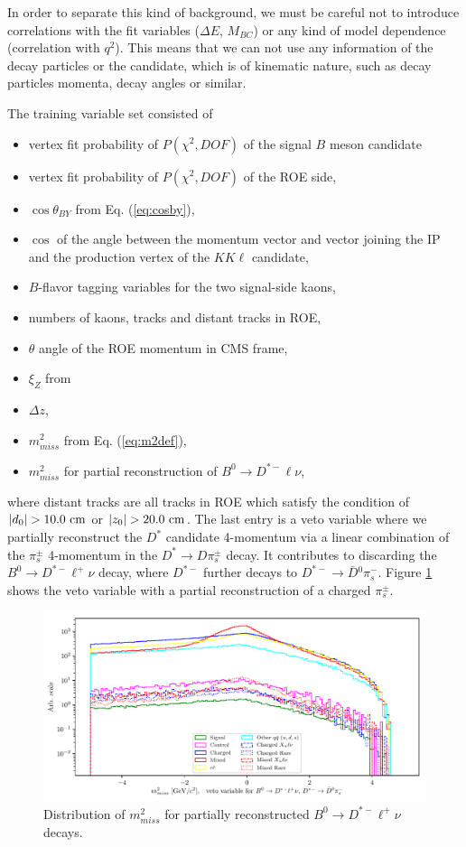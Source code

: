 In order to separate this kind of background, we must be careful not to introduce correlations with the fit variables ($\Delta E$, $M_{BC}$) or any kind of model dependence (correlation with $q^2$). This means that we can not use any information of the decay particles or the candidate, which is of kinematic nature, such as decay particles momenta, decay angles or similar.

The training variable set consisted of
\begin{itemize}
	\item vertex fit probability of $P(\chi^2,DOF)$ of the signal $B$ meson candidate
	\item vertex fit probability of $P(\chi^2,DOF)$ of the ROE side,
	\item $\cos\theta_{BY}$ from Eq. (\ref{eq:cosby}),
	\item $\cos$ of the angle between the momentum vector and vector joining the IP and the production vertex of the $KK\ell$ candidate,
	\item $B$-flavor tagging variables for the two signal-side kaons,
	\item numbers of kaons, tracks and distant tracks in ROE,
	\item $\theta$ angle of the ROE momentum in CMS frame,
	\item $\xi_Z$ from \cite{PhysRevD.83.032007}
	\item $\Delta z$,
	\item $m_{miss}^2$ from Eq. (\ref{eq:m2def}),
	\item $m_{miss}^2$ for partial reconstruction of $B^0 \to D^{*-} \ell \nu$,
\end{itemize}
where distant tracks are all tracks in ROE which satisfy the condition of $\vert d_0 \vert  > 10.0\mathrm{~cm}$ or $\vert z_0 \vert > 20.0\mathrm{~cm}$. The last entry is a veto variable where we partially reconstruct the $D^*$ candidate 4-momentum via a linear combination of the $\pi^\pm_s$ 4-momentum in the $D^* \to D \pi_s^\pm$ decay. It contributes to discarding the $B^0 \to D^{*-} \ell^+ \nu$ decay, where $D^{*-}$ further decays to $D^{*-} \to \bar D {}^0 \pi^-_s$. Figure \ref{fig:vetoplot} shows the veto variable with a partial reconstruction of a charged $\pi_s^\pm$.

\begin{figure}[H]
	\centering
	\captionsetup{width=0.8\linewidth}
	\includegraphics[width=\linewidth]{fig/bb_partial_veto}
	\caption{Distribution of $m_{miss}^2$ for partially reconstructed $B^0 \to D^{*-} \ell^+ \nu$ decays.}
	\label{fig:vetoplot}
\end{figure}

